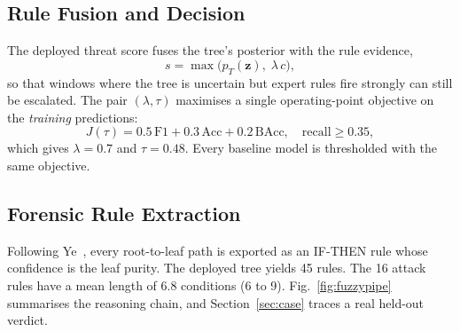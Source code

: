 \documentclass[conference]{IEEEtran}
\begin{document}
\subsection{Rule Fusion and Decision}
The deployed threat score fuses the tree's posterior with the rule evidence,
\begin{equation}
  s=\max\!\big(p_T(\mathbf{z}),\;\lambda\,c\big),
  \label{eq:fusion}
\end{equation}
so that windows where the tree is uncertain but expert rules fire strongly can still be escalated. The pair $(\lambda,\tau)$ maximises a single operating-point objective on the \emph{training} predictions:
\begin{equation}
  J(\tau)=0.5\,\mathrm{F1}+0.3\,\mathrm{Acc}+0.2\,\mathrm{BAcc},\quad \text{recall}\ge0.35,
  \label{eq:objective}
\end{equation}
which gives $\lambda=0.7$ and $\tau=0.48$. Every baseline model is thresholded with the same objective.

\subsection{Forensic Rule Extraction}
Following Ye~\cite{ye2022}, every root-to-leaf path is exported as an IF-THEN rule whose confidence is the leaf purity. The deployed tree yields 45 rules. The 16 attack rules have a mean length of 6.8 conditions (6 to 9). Fig.~\ref{fig:fuzzypipe} summarises the reasoning chain, and Section~\ref{sec:case} traces a real held-out verdict.
\end{document}
